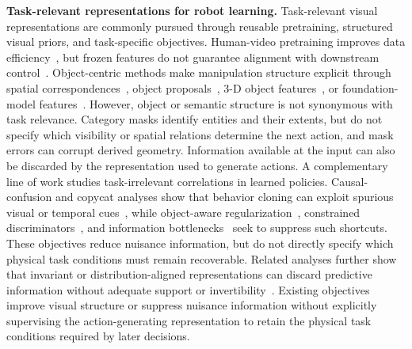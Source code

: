 \noindent\textbf{Task-relevant representations for robot learning.}
Task-relevant visual representations are commonly pursued through reusable pretraining, structured visual priors, and task-specific objectives.
Human-video pretraining improves data efficiency~\cite{nair2023r3m}, but frozen features do not guarantee alignment with downstream control~\cite{hansen2023pretraining}.
Object-centric methods make manipulation structure explicit through spatial correspondences~\cite{zeng2021transporter}, object proposals~\cite{zhu2023viola}, 3-D object features~\cite{zhu2023groot}, or foundation-model features~\cite{zhang2024same}.
However, object or semantic structure is not synonymous with task relevance.
Category masks identify entities and their extents, but do not specify which visibility or spatial relations determine the next action, and mask errors can corrupt derived geometry.
Information available at the input can also be discarded by the representation used to generate actions.
A complementary line of work studies task-irrelevant correlations in learned policies.
Causal-confusion and copycat analyses show that behavior cloning can exploit spurious visual or temporal cues~\cite{dehaan2019,wen2020copycat}, while object-aware regularization~\cite{park2021oreo}, constrained discriminators~\cite{zolna2021trail}, and information bottlenecks~\cite{bai2025ibbc} seek to suppress such shortcuts.
These objectives reduce nuisance information, but do not directly specify which physical task conditions must remain recoverable.
Related analyses further show that invariant or distribution-aligned representations can discard predictive information without adequate support or invertibility~\cite{johansson2019support,zhao2019invariant}.
Existing objectives improve visual structure or suppress nuisance information without explicitly supervising the action-generating representation to retain the physical task conditions required by later decisions.
